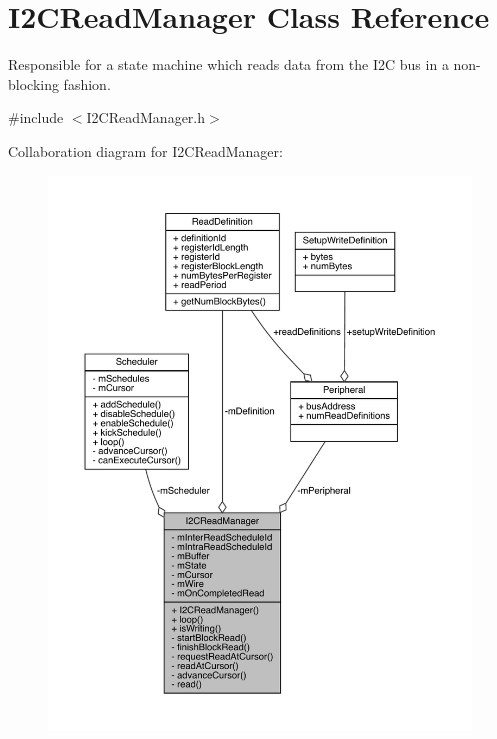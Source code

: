 \hypertarget{class_i2_c_read_manager}{}\section{I2\+C\+Read\+Manager Class Reference}
\label{class_i2_c_read_manager}


Responsible for a state machine which reads data from the I2C bus in a non-\/blocking fashion.  




{\ttfamily \#include $<$I2\+C\+Read\+Manager.\+h$>$}



Collaboration diagram for I2\+C\+Read\+Manager\+:\nopagebreak
\begin{figure}[H]
\begin{center}
\leavevmode
\includegraphics[width=350pt]{class_i2_c_read_manager__coll__graph}
\end{center}
\end{figure}
